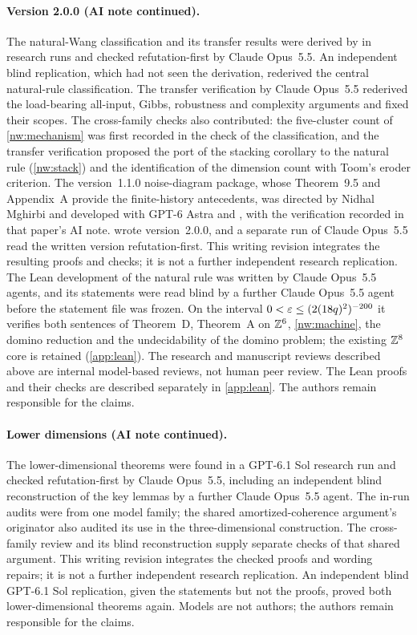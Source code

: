 \paragraph{Version 2.0.0 (AI note continued).}
The natural-Wang classification and its transfer results were derived by \OPENAIMODEL{} in research runs and checked refutation-first by Claude Opus~5.5. An independent blind \OPENAIMODEL{} replication, which had not seen the derivation, rederived the central natural-rule classification. The transfer verification by Claude Opus~5.5 rederived the load-bearing all-input, Gibbs, robustness and complexity arguments and fixed their scopes. The cross-family checks also contributed: the five-cluster count of \cref{nw:mechanism} was first recorded in the check of the classification, and the transfer verification proposed the port of the stacking corollary to the natural rule (\cref{nw:stack}) and the identification of the dimension count with Toom's eroder criterion. The version~1.1.0 noise-diagram package, whose Theorem~9.5 and Appendix~A provide the finite-history antecedents, was directed by Nidhal Mghirbi and developed with GPT-6 Astra and \OPENAIMODEL{}, with the verification recorded in that paper's AI note. \OPENAIMODEL{} wrote version~2.0.0, and a separate run of Claude Opus~5.5 read the written version refutation-first. This writing revision integrates the resulting proofs and checks; it is not a further independent research replication. The Lean development of the natural rule was written by Claude Opus~5.5 agents, and its statements were read blind by a further Claude Opus~5.5 agent before the statement file was frozen. On the interval $0<\varepsilon\le(2(18q)^2)^{-200}$ it verifies both sentences of Theorem~D, Theorem~A on $\mathbb{Z}^6$, \cref{nw:machine}, the domino reduction and the undecidability of the domino problem; the existing $\mathbb{Z}^8$ core is retained (\cref{app:lean}). The research and manuscript reviews described above are internal model-based reviews, not human peer review. The Lean proofs and their checks are described separately in \cref{app:lean}. The authors remain responsible for the claims.

\paragraph{Lower dimensions (AI note continued).}
The lower-dimensional theorems were found in a GPT-6.1 Sol research run and checked refutation-first by Claude Opus~5.5, including an independent blind reconstruction of the key lemmas by a further Claude Opus~5.5 agent. The in-run audits were from one model family; the shared amortized-coherence argument's originator also audited its use in the three-dimensional construction. The cross-family review and its blind reconstruction supply separate checks of that shared argument. This writing revision integrates the checked proofs and wording repairs; it is not a further independent research replication. An independent blind GPT-6.1 Sol replication, given the statements but not the proofs, proved both lower-dimensional theorems again. Models are not authors; the authors remain responsible for the claims.
